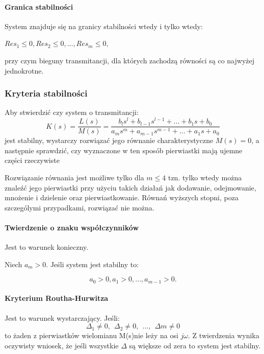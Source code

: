 \documentclass[a4paper,twoside]{report}
\begin{document}
\paragraph{Granica stabilności\\} System znajduje się na granicy stabilności wtedy i tylko wtedy:
\begin{center}
	$Res_{1}\le0,Res_{2}\le0,...,Re s_{m}\le0, $
\end{center}
przy czym bieguny transmitancji, dla których zachodzą równości są co najwyżej jednokrotne.

\subsubsection{Kryteria stabilności}
Aby stwierdzić czy system o transmitancji:
\begin{equation}
K(s)=\dfrac{L(s)}{M(s)}=\dfrac{b_{l}s^{l}+b_{l-1}s^{l-1}+...+b_{1}s+b_{0}}{a_{m}s^{m}+a_{m-1}s^{m-1}+...+a_{1}s+a_{0}}
\end{equation}
jest stabilny, wystarczy rozwiązać jego równanie charakterystyczne $M(s)=0$, a następnie sprawdzić, czy wyznaczone w ten sposób pierwiastki mają ujemne części rzeczywiste 

Rozwiązanie równania jest możliwe tylko dla $m \le 4 $ tzn. tylko wtedy można znaleźć jego pierwiastki przy użyciu takich działań jak dodawanie, odejmowanie, mnożenie i dzielenie oraz pierwiastkowanie. Równań wyższych stopni, poza szczególymi przypadkami, rozwiązać nie można.


\paragraph{Twierdzenie o znaku współczynników\\}
Jest to warunek konieczny.

Niech $ a_{m}>0 $. Jeśli system jest stabilny to:

	$$ a_{0}>0,a_{1}>0,...,a_{m-1}>0. $$

\paragraph{Kryterium Routha-Hurwitza\\}
Jest to warunek wystarczający. Jeśli:
$$\Delta_{1}\neq 0,~~\Delta_{2}\neq 0,~~...,~~\Delta{m}\neq 0 $$
to żaden z pierwiastków wielomianu M(s)nie leży na osi $j\omega $.
Z twierdzenia wynika oczywisty wniosek, że jeśli wszystkie $ \Delta$ są większe od zera to system jest stabilny.
\end{document}
